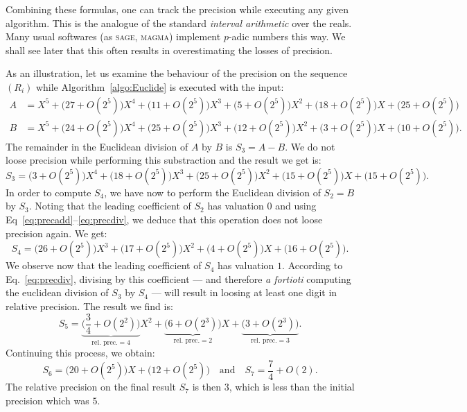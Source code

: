 \documentclass{article}
\begin{document}

\noindent
Combining these formulas, one can track the precision while executing 
any given algorithm. This is the analogue of the standard \emph{interval 
arithmetic} over the reals. Many usual softwares (as \textsc{sage}, 
\textsc{magma}) implement $p$-adic numbers this way. We shall see later
that this often results in overestimating the losses of precision.

\begin{ex}
\label{ex:Euclide}
As an illustration, let us examine the behaviour of the precision
on the sequence $(R_i)$ while Algorithm~\ref{algo:Euclide} is
executed with the input:
\begin{align*}
A & = X^5 + 
      \big(27 + O(2^5)\big) X^4 +
      \big(11 + O(2^5)\big) X^3 +
      \big(5 + O(2^5)\big) X^2 +
      \big(18 + O(2^5)\big) X +
      \big(25 + O(2^5)\big) \\
B & = X^5 + 
      \big(24 + O(2^5)\big) X^4 +
      \big(25 + O(2^5)\big) X^3 +
      \big(12 + O(2^5)\big) X^2 +
      \big(3 + O(2^5)\big) X +
      \big(10 + O(2^5)\big).
\end{align*}
The remainder in the Euclidean division of $A$ by $B$ is $S_3 = A-B$.
We do not loose precision while performing this substraction and the
result we get is:
$$S_3 = 
      \big(3 + O(2^5)\big) X^4 +
      \big(18 + O(2^5)\big) X^3 +
      \big(25 + O(2^5)\big) X^2 +
      \big(15 + O(2^5)\big) X +
      \big(15 + O(2^5)\big).$$ 
In order to compute $S_4$, we have now to perform the Euclidean division 
of $S_2 = B$ by $S_3$. Noting that the leading coefficient of $S_2$ has 
valuation $0$ and using Eq~\eqref{eq:precadd}--\eqref{eq:precdiv}, we 
deduce that this operation does not loose precision again. We get:
$$S_4 = 
      \big(26 + O(2^5)\big) X^3 +
      \big(17 + O(2^5)\big) X^2 +
      \big(4 + O(2^5)\big) X +
      \big(16 + O(2^5)\big).$$
We observe now that the leading coefficient of $S_4$ has valuation $1$. 
According to Eq.~\eqref{eq:precdiv}, divising by this coefficient ---
and therefore \emph{a fortioti} computing the euclidean division of 
$S_3$ by $S_4$ --- will result in loosing at least one digit in
relative precision. The result we find is:
$$S_5 = 
      \underbrace{\big(\textstyle \frac 3 4 + O(2^2)\big)}_{\text{rel. prec.} = 4} X^2 +
      \underbrace{\big(6 + O(2^3)\big)}_{\text{rel. prec.} = 2} X +
      \underbrace{\big(3 + O(2^3)\big)}_{\text{rel. prec.} = 3}.$$
Continuing this process, we obtain:
$$S_6 = 
      \big(20 + O(2^5)\big) X +
      \big(12 + O(2^5)\big) 
\quad \text{and} \quad
S_7 =
      \textstyle \frac 7 4 + O(2).$$
The relative precision on the final result $S_7$ is then $3$, which is
less than the initial precision which was $5$.
\end{ex}
\end{document}
